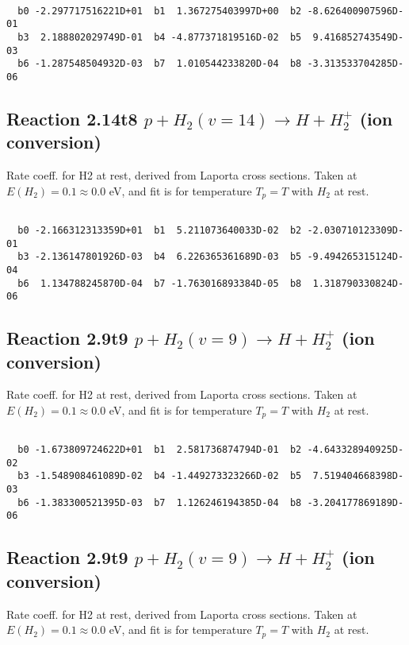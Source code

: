 \begin{small}\begin{verbatim}

  b0 -2.297717516221D+01  b1  1.367275403997D+00  b2 -8.626400907596D-01
  b3  2.188802029749D-01  b4 -4.877371819516D-02  b5  9.416852743549D-03
  b6 -1.287548504932D-03  b7  1.010544233820D-04  b8 -3.313533704285D-06

\end{verbatim}\end{small}

\newpage
\subsection{
Reaction 2.14t8
$ p + H_2(v=14) \rightarrow H + H_2^+$ (ion conversion)
}
Rate coeff. for H2 at rest, derived from Laporta cross sections.
Taken at $E(H_2) = 0.1 \approx 0.0$ eV,  and fit is for temperature $T_p=T$ with $H_2$ at rest.

\begin{small}\begin{verbatim}

  b0 -2.166312313359D+01  b1  5.211073640033D-02  b2 -2.030710123309D-01
  b3 -2.136147801926D-03  b4  6.226365361689D-03  b5 -9.494265315124D-04
  b6  1.134788245870D-04  b7 -1.763016893384D-05  b8  1.318790330824D-06

\end{verbatim}\end{small}

\newpage
\subsection{
Reaction 2.9t9
$ p + H_2(v=9) \rightarrow H + H_2^+$ (ion conversion)
}
Rate coeff. for H2 at rest, derived from Laporta cross sections.
Taken at $E(H_2) = 0.1 \approx 0.0$ eV,  and fit is for temperature $T_p=T$ with $H_2$ at rest.

\begin{small}\begin{verbatim}

  b0 -1.673809724622D+01  b1  2.581736874794D-01  b2 -4.643328940925D-02
  b3 -1.548908461089D-02  b4 -1.449273323266D-02  b5  7.519404668398D-03
  b6 -1.383300521395D-03  b7  1.126246194385D-04  b8 -3.204177869189D-06

\end{verbatim}\end{small}

\newpage
\subsection{
Reaction 2.9t9
$ p + H_2(v=9) \rightarrow H + H_2^+$ (ion conversion)
}
Rate coeff. for H2 at rest, derived from Laporta cross sections.
Taken at $E(H_2) = 0.1 \approx 0.0$ eV,  and fit is for temperature $T_p=T$ with $H_2$ at rest.

